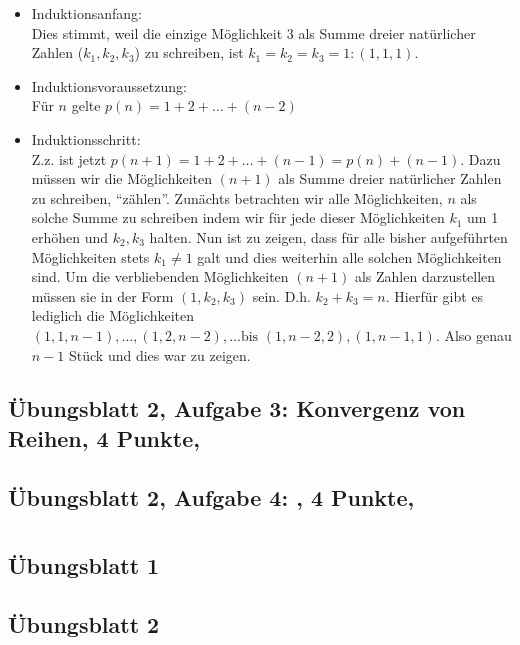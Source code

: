 \documentclass[12pt,a4paper]{report}
\begin{document}
	\begin{itemize}
		\item Induktionsanfang: \\
		Dies stimmt, weil die einzige Möglichkeit 3 als Summe dreier natürlicher Zahlen ($k_1, k_2, k_3$) zu schreiben, ist $k_1=k_2=k_3=1: (1,1,1)$.
		\item Induktionsvoraussetzung: \\
		Für $n$ gelte $p(n) = 1+2+\ldots+(n-2)$
		\item Induktionsschritt: \\
		Z.z. ist jetzt $p(n+1) = 1+2+\ldots+(n-1) = p(n)+(n-1)$. Dazu müssen wir die Möglichkeiten $(n+1)$ als Summe dreier natürlicher Zahlen zu schreiben, \enquote{zählen}. Zunächts betrachten wir alle Möglichkeiten, $n$ als solche Summe zu schreiben indem wir für jede dieser Möglichkeiten $k_1$ um 1 erhöhen und $k_2, k_3$ halten. Nun ist zu zeigen, dass für alle bisher aufgeführten Möglichkeiten stets $k_1 \neq 1$ galt und dies weiterhin alle solchen Möglichkeiten sind. Um die verbliebenden Möglichkeiten $(n+1)$ als Zahlen darzustellen müssen sie in der Form $(1, k_2, k_3)$ sein. D.h. $k_2+k_3 = n$. Hierfür gibt es lediglich die Möglichkeiten $(1, 1, n-1), \ldots, (1,2,n-2),\ldots \text{bis } (1,n-2,2),(1,n-1,1)$. Also genau $n-1$ Stück und dies war zu zeigen. 
	\end{itemize}

	\section{Übungsblatt 2, Aufgabe 3: Konvergenz von Reihen, 4 Punkte, \GruppeA}
	\section{Übungsblatt 2, Aufgabe 4: , 4 Punkte, \GruppeA}

\appendices
	\chapter{}
	\section{Übungsblatt 1}\label{uebungsblatt1}
	
	\section{Übungsblatt 2}\label{uebungsblatt2}
	
\end{document}
